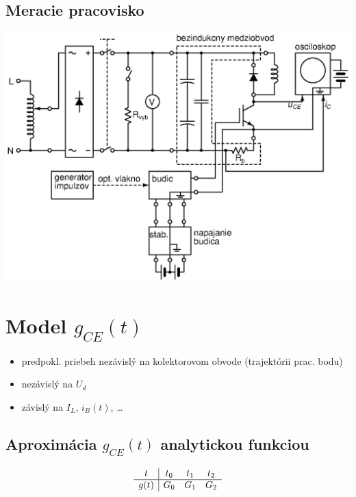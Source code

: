 \documentclass[oneside]{article}
\begin{document}
\subsection{Meracie pracovisko}

{\centering \includegraphics[height=.9\textheight]{schema_pracovisko} \par }




{\centering \section{Model $g_{CE}(t)$} \label{sec:model} }

{\centering  \par}

\begin{itemize}
    \item predpokl. priebeh nezávislý na kolektorovom obvode (trajektórii prac. bodu)
    \item nezávislý na $U_d$
    \item závislý na $I_L$, $i_B(t)$, \ldots
\end{itemize}


\subsection{Aproximácia $g_{CE}(t)$ analytickou funkciou}
\begin{equation}
	\begin{array}{c | c c c}
		t & t_0 & t_1 & t_2 \\
		\hline
		g(t) & G_0 & G_1 & G_2
	\end{array}
	\label{eq:tab_predpis_t012}
\end{equation}
\end{document}
